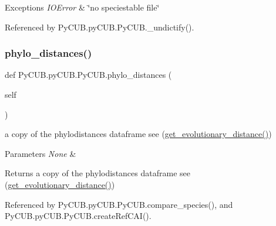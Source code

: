 \begin{DoxyExceptions}{Exceptions}
{\em I\+O\+Error} & \char`\"{}no speciestable file\char`\"{} \\
\hline
\end{DoxyExceptions}


Referenced by Py\+C\+U\+B.\+py\+C\+U\+B.\+Py\+C\+U\+B.\+\_\+undictify().

\mbox{\label{class_py_c_u_b_1_1py_c_u_b_1_1_py_c_u_b_a2ea40ac1dd5b4ad8847ec12c867d457f}} 
\subsubsection{\texorpdfstring{phylo\+\_\+distances()}{phylo\_distances()}}
{\footnotesize\ttfamily def Py\+C\+U\+B.\+py\+C\+U\+B.\+Py\+C\+U\+B.\+phylo\+\_\+distances (\begin{DoxyParamCaption}\item[{}]{self }\end{DoxyParamCaption})}



a copy of the phylodistances dataframe see (\mbox{\hyperlink{class_py_c_u_b_1_1py_c_u_b_1_1_py_c_u_b_af0d7bed125f4437bea6b8051f9922c1d}{get\+\_\+evolutionary\+\_\+distance()}}) 


\begin{DoxyParams}{Parameters}
{\em None} & \\
\hline
\end{DoxyParams}
\begin{DoxyReturn}{Returns}
a copy of the phylodistances dataframe see (\mbox{\hyperlink{class_py_c_u_b_1_1py_c_u_b_1_1_py_c_u_b_af0d7bed125f4437bea6b8051f9922c1d}{get\+\_\+evolutionary\+\_\+distance()}}) 
\end{DoxyReturn}


Referenced by Py\+C\+U\+B.\+py\+C\+U\+B.\+Py\+C\+U\+B.\+compare\+\_\+species(), and Py\+C\+U\+B.\+py\+C\+U\+B.\+Py\+C\+U\+B.\+create\+Ref\+C\+A\+I().

\mbox{\label{class_py_c_u_b_1_1py_c_u_b_1_1_py_c_u_b_a4e13b55153bbe774e9203818f2b7f690}} 
